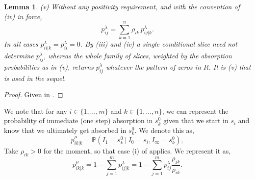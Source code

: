 \documentclass{article}
\newtheorem{lemma}{Lemma}
\newenvironment{subrevision}{}{}
\newcommand{\subchg}[1]{#1}
\begin{document}
\begin{subrevision}
\begin{lemma}
\noindent \textup{(v)} Without any positivity requirement, and with the convention of
\textup{(iv)} in force,
%
\begin{equation}
\label{eq:pijk-aggregation}
p^\lambda_{ij} = \sum_{k=1}^n \rho_{ik}\, p^\lambda_{ij|k} .
\end{equation}
%
\noindent In all cases $p^\lambda_{ii|k} = p^\lambda_{ii} = 0$. By \textup{(iii)} and \textup{(iv)} a
single conditional slice need not determine $p^\lambda_{ij}$, whereas the whole family of slices,
weighted by the absorption probabilities as in \textup{(v)}, returns $p^\lambda_{ij}$ whatever the
pattern of zeros in $R$. It is \textup{(v)} that is used in the sequel.
\end{lemma}

\begin{proof}
Given in .
\end{proof}
\end{subrevision}

We note that for any $i \in \{1,\ldots,m\}$ and $k \in \{1,\ldots,n\}$, we can represent the probability of immediate (one step) absorption in $s_k^0$ given that we start in $s_i$ and know that we ultimately get absorbed in $s_k^0$. We denote this as, 
%
\begin{equation}
\label{eq:pik-mu-from-pijk-1}  
p^\mu_{ik|k} 
=
\mathbb{P}(I_1 = s_k^0 ~\vert~ I_0 = s_i, I_
\infty = s_k^0),
\end{equation}
%
\subchg{Take $\rho_{ik}>0$ for the moment, so that case \textup{(i)} of \Cref{lem:cond-jump-probs}
applies.} We represent it as,
\begin{equation}
\label{eq:pik-mu-from-pijk-2}  
p^\mu_{ik|k}  = 1 - \sum_{j=1}^m p^\lambda_{ij |k} = 1 - \sum_{j = 1}^{m} p_{ij}^{\lambda} \frac{\rho_{jk}}{\rho_{ik}} .
\end{equation}
\end{document}
